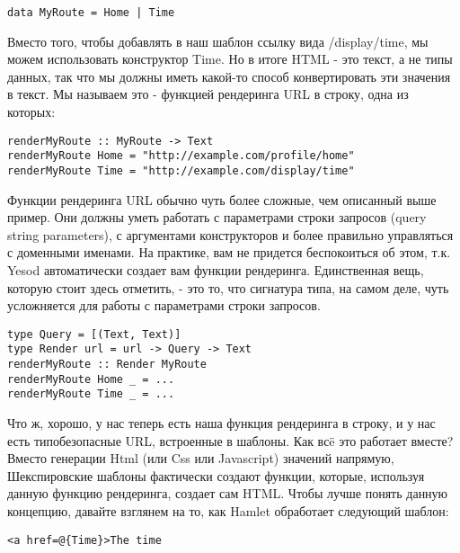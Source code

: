 \begin{lstlisting}
data MyRoute = Home | Time
\end{lstlisting}

Вместо того, чтобы добавлять в наш шаблон ссылку вида /display/time, мы можем
использовать конструктор Time. Но в итоге HTML - это текст, а не типы данных,
так что мы должны иметь какой-то способ конвертировать эти значения в текст.
Мы называем это - функцией рендеринга URL в строку, одна из которых:

\begin{lstlisting}
renderMyRoute :: MyRoute -> Text
renderMyRoute Home = "http://example.com/profile/home"
renderMyRoute Time = "http://example.com/display/time"
\end{lstlisting}

Функции рендеринга URL обычно чуть более сложные, чем описанный выше пример.
Они должны уметь работать с параметрами строки запросов (query string parameters),
с аргументами конструкторов и более правильно управляться с доменными именами.
На практике, вам не придется беспокоиться об этом, т.к. Yesod автоматически 
создает вам функции рендеринга. Единственная вещь, которую стоит здесь отметить,
 - это то, что сигнатура типа, на самом деле, чуть усложняется для 
работы с параметрами строки запросов.

\begin{lstlisting}
type Query = [(Text, Text)]                                                     
type Render url = url -> Query -> Text                                          
renderMyRoute :: Render MyRoute                                                 
renderMyRoute Home _ = ...                                                      
renderMyRoute Time _ = ...   
\end{lstlisting}

Что ж, хорошо, у нас теперь есть наша функция рендеринга в строку, и у нас есть
типобезопасные URL, встроенные в шаблоны. Как всë это работает вместе?
Вместо генерации Html (или Css или Javascript) значений напрямую, 
Шекспировские шаблоны фактически создают функции, которые, используя данную
функцию рендеринга, создает сам HTML. Чтобы лучше понять данную концепцию,
давайте взглянем на то, как Hamlet обработает следующий шаблон:

\begin{lstlisting}
<a href=@{Time}>The time                                                        
\end{lstlisting}
                                                                                
